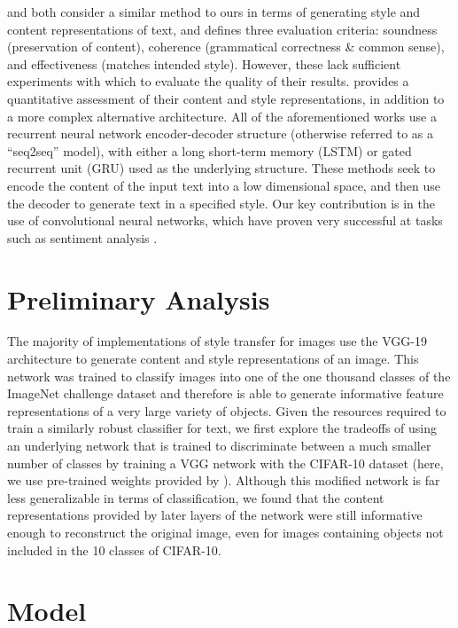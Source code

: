 \documentclass{vldb}
\begin{document}
\cite{Edirisooriya} and \cite{Kabbara16} both consider a similar method to ours in terms of generating style and content representations of text, and \cite{Kabbara16} defines three evaluation criteria: soundness (preservation of content), coherence (grammatical correctness \& common sense), and effectiveness (matches intended style). However, these lack sufficient experiments with which to evaluate the quality of their results. \cite{Fu17} provides a quantitative assessment of their content and style representations, in addition to a more complex alternative architecture. All of the aforementioned works use a recurrent neural network encoder-decoder structure (otherwise referred to as a ``seq2seq'' model), with either a long short-term memory (LSTM) or gated recurrent unit (GRU) used as the underlying structure. These methods seek to encode the content of the input text into a low dimensional space, and then use the decoder to generate text in a specified style. Our key contribution is in the use of convolutional neural networks, which have proven very successful at tasks such as sentiment analysis \cite{Kim14f}.

\section{Preliminary Analysis}
The majority of implementations of style transfer for images use the VGG-19 \cite{VGG19} architecture to generate content and style representations of an image. This network was trained to classify images into one of the one thousand classes of the ImageNet challenge dataset \cite{ILSVRC15} and therefore is able to generate informative feature representations of a very large variety of objects. Given the resources required to train a similarly robust classifier for text, we first explore the tradeoffs of using an underlying network that is trained to discriminate between a much smaller number of classes by training a VGG network with the CIFAR-10 dataset \cite{Krizhevsky09} (here, we use pre-trained weights provided by \cite{Liu15}). Although this modified network is far less generalizable in terms of classification, we found that the content representations provided by later layers of the network were still informative enough to reconstruct the original image, even for images containing objects not included in the 10 classes of CIFAR-10. 

\section{Model}
\end{document}

